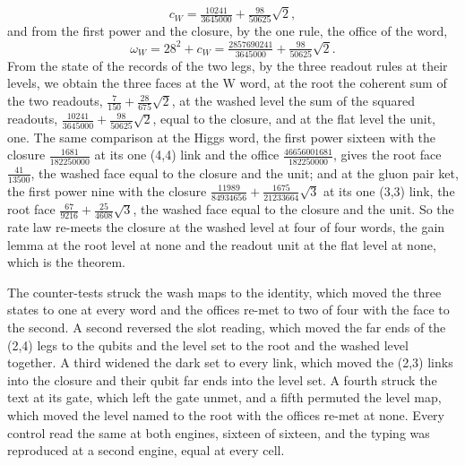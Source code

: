\begin{chproof}
\begin{equation}
c_{W} = \tfrac{10241}{3645000} + \tfrac{98}{50625}\sqrt{2} ,
\end{equation}
and from the first power and the closure, by the one rule, the office of the word,
\begin{equation}
\omega_{W} = 28^{2} + c_{W} = \tfrac{2857690241}{3645000} + \tfrac{98}{50625}\sqrt{2} .
\end{equation}
From the state of the records of the two legs, by the three readout rules at their levels, we obtain the three faces at the W word, at the root the coherent sum of the two readouts, $\tfrac{7}{150} + \tfrac{28}{675}\sqrt{2}$, at the washed level the sum of the squared readouts, $\tfrac{10241}{3645000} + \tfrac{98}{50625}\sqrt{2}$, equal to the closure, and at the flat level the unit, one. The same comparison at the Higgs word, the first power sixteen with the closure $\tfrac{1681}{182250000}$ at its one (4,4) link and the office $\tfrac{46656001681}{182250000}$, gives the root face $\tfrac{41}{13500}$, the washed face equal to the closure and the unit; and at the gluon pair ket, the first power nine with the closure $\tfrac{11989}{84934656} + \tfrac{1675}{21233664}\sqrt{3}$ at its one (3,3) link, the root face $\tfrac{67}{9216} + \tfrac{25}{4608}\sqrt{3}$, the washed face equal to the closure and the unit. So the rate law re-meets the closure at the washed level at four of four words, the gain lemma at the root level at none and the readout unit at the flat level at none, which is the theorem.

The counter-tests struck the wash maps to the identity, which moved the three states to one at every word and the offices re-met to two of four with the face to the second. A second reversed the slot reading, which moved the far ends of the (2,4) legs to the qubits and the level set to the root and the washed level together. A third widened the dark set to every link, which moved the (2,3) links into the closure and their qubit far ends into the level set. A fourth struck the text at its gate, which left the gate unmet, and a fifth permuted the level map, which moved the level named to the root with the offices re-met at none. Every control read the same at both engines, sixteen of sixteen, and the typing was reproduced at a second engine, equal at every cell.
\end{chproof}
